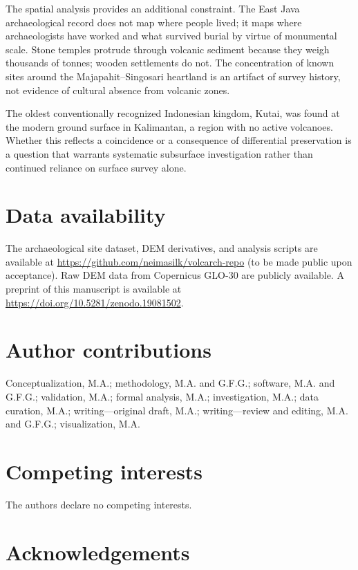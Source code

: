\documentclass[12pt,a4paper]{article}
\begin{document}
The spatial analysis provides an additional constraint. The East Java archaeological record does not map where people lived; it maps where archaeologists have worked and what survived burial by virtue of monumental scale. Stone temples protrude through volcanic sediment because they weigh thousands of tonnes; wooden settlements do not. The concentration of known sites around the Majapahit--Singosari heartland is an artifact of survey history, not evidence of cultural absence from volcanic zones.

The oldest conventionally recognized Indonesian kingdom, Kutai, was found at the modern ground surface in Kalimantan, a region with no active volcanoes. Whether this reflects a coincidence or a consequence of differential preservation is a question that warrants systematic subsurface investigation rather than continued reliance on surface survey alone.


\section*{Data availability}

The archaeological site dataset, DEM derivatives, and analysis scripts are available at \url{https://github.com/neimasilk/volcarch-repo} (to be made public upon acceptance). Raw DEM data from Copernicus GLO-30 are publicly available. A preprint of this manuscript is available at \url{https://doi.org/10.5281/zenodo.19081502}.


\section*{Author contributions}

Conceptualization, M.A.; methodology, M.A. and G.F.G.; software, M.A. and G.F.G.; validation, M.A.; formal analysis, M.A.; investigation, M.A.; data curation, M.A.; writing---original draft, M.A.; writing---review and editing, M.A. and G.F.G.; visualization, M.A.

\section*{Competing interests}

The authors declare no competing interests.

\section*{Acknowledgements}
\end{document}
